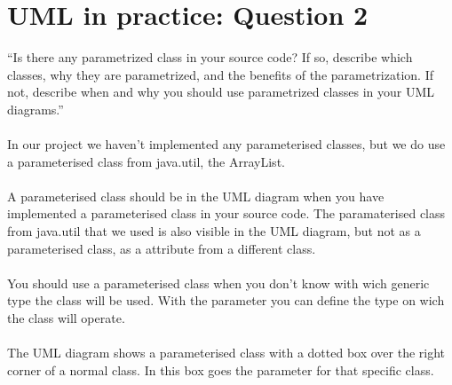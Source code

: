 \chapter{UML in practice: Question 2}

``Is there any parametrized class in your source code? If so, describe which classes, why they are
parametrized, and the benefits of the parametrization. If not, describe when and why you should use
parametrized classes in your UML diagrams.''
\\
\\
In our project we haven't implemented any parameterised classes, but we do use a parameterised class from java.util, the ArrayList. \\
\\
A parameterised class should be in the UML diagram when you have implemented a parameterised class in your source code. The paramaterised class from java.util that we used is also visible in the UML diagram, but not as a parameterised class, as a attribute from a different class.\\
\\
You should use a parameterised class when you don't know with wich generic type the class will be used. With the parameter you can define the type on wich the class will operate.\\
\\
The UML diagram shows a parameterised class with a dotted box over the right corner of a normal class. In this box goes the parameter for that specific class. 